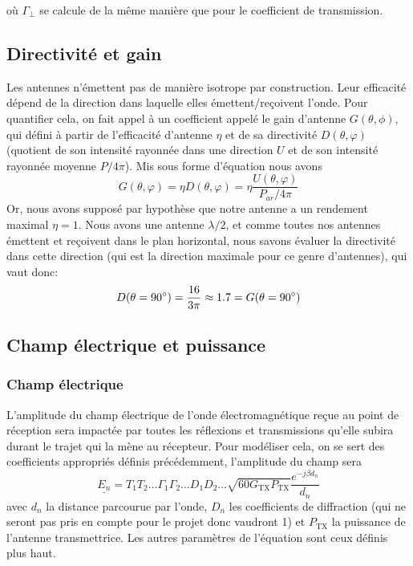 o{\`u} $\Gamma_{\perp}$ se calcule de la m{\^e}me mani{\`e}re que pour le
coefficient de transmission.

\subsection{Directivit{\'e} et gain}

Les antennes n'{\'e}mettent pas de mani{\`e}re isotrope par construction. Leur
efficacit{\'e} d{\'e}pend de la direction dans laquelle elles
{\'e}mettent/re{\c c}oivent l'onde. Pour quantifier cela, on fait appel {\`a}
un coefficient appel{\'e} le gain d'antenne $G (\theta, \phi)$, qui défini
{\`a} partir de l'efficacité d'antenne $\eta$ et de sa directivit{\'e} $D (\theta, \varphi)$ (quotient de son intensit{\'e} rayonn{\'e}e
dans une direction $U$ et de son intensit{\'e} rayonn{\'e}e moyenne $P / 4
\pi$). Mis sous forme d'{\'e}quation nous avons
\[ G (\theta, \varphi) = \eta D (\theta, \varphi) = \eta \frac{U (\theta,
   \varphi)}{P_{a r} / 4 \pi} \]
Or, nous avons suppos{\'e} par hypoth{\`e}se que notre antenne a un rendement
maximal $\eta = 1$. Nous avons une antenne $\lambda / 2$, et comme toutes nos
antennes {\'e}mettent et re{\c c}oivent dans le plan horizontal, nous savons
{\'e}valuer la directivit{\'e} dans cette direction (qui est la direction
maximale pour ce genre d'antennes), qui vaut donc:
\[ D (\theta = 90\degree) = \frac{16}{3 \pi} \approx 1.7 = G
   (\theta = 90\degree )\]
   
\subsection{Champ {\'e}lectrique et puissance }

\subsubsection*{Champ électrique}
L'amplitude du champ {\'e}lectrique de l'onde {\'e}lectromagn{\'e}tique re{\c
c}ue au point de r{\'e}ception sera impact{\'e}e par toutes les r{\'e}flexions
et transmissions qu'elle subira durant le trajet qui la m{\`e}ne au
r{\'e}cepteur. Pour mod{\'e}liser cela, on se sert des coefficients
appropri{\'e}s d{\'e}finis pr{\'e}c{\'e}demment, l'amplitude du champ sera
\begin{equation}
\label{eq:elec-field}
    \underline{E_n} = T_1 T_2 \ldots \Gamma_1 \Gamma_2 \ldots D_1 D_2 \ldots \sqrt{60 G_{\mathrm{TX}} P_{\mathrm{TX}}} \frac{e^{- j \beta d_n}}{d_n}
\end{equation}
avec $d_n$ la distance parcourue par l'onde, $D_n$ les coefficients de
diffraction (qui ne seront pas pris en compte pour le projet donc vaudront 1)
et $P_{\mathrm{TX}}$ la puissance de l'antenne transmettrice. Les autres param{\`e}tres de
l'{\'e}quation sont ceux d{\'e}finis plus haut.

